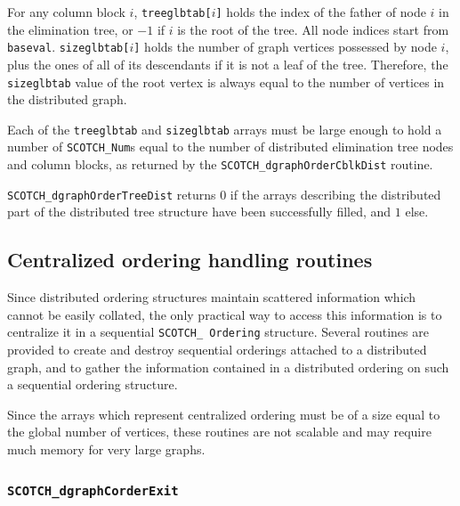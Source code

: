 \begin{itemize}
For any column block $i$, {\tt treeglbtab[}$i${\tt ]} holds the index
of the father of node $i$ in the elimination tree, or $-1$ if $i$ is
the root of the tree. All node indices start from
{\tt baseval}. {\tt size\lbt glb\lbt tab[}$i${\tt ]} holds the number
of graph vertices possessed by node $i$, plus the ones of all
of its descendants if it is not a leaf of the tree. Therefore, the
{\tt size\lbt glb\lbt tab} value of the root vertex is always equal to
the number of vertices in the distributed graph.

Each of the {\tt treeglbtab} and {\tt size\lbt glb\lbt tab} arrays
must be large enough to hold a number of {\tt SCOTCH\_\lbt Num}s equal
to the number of distributed elimination tree nodes and column blocks,
as returned by the {\tt SCOTCH\_\lbt dgraph\lbt Order\lbt Cblk\lbt Dist}
routine.

\progret

{\tt SCOTCH\_dgraphOrderTreeDist} returns $0$ if the arrays describing
the distributed part of the distributed tree structure have been
successfully filled, and $1$ else.
\end{itemize}

\subsection{Centralized ordering handling routines}
\label{sec-lib-func-corder}

Since distributed ordering structures maintain scattered information
which cannot be easily collated, the only practical way to access this
information is to centralize it in a sequential {\tt SCOTCH\_\lbt
Ordering} structure. Several routines are provided to
create and destroy sequential orderings attached to a distributed
graph, and to gather the information contained in a distributed
ordering on such a sequential ordering structure.

Since the arrays which represent centralized ordering must be of a
size equal to the global number of vertices, these routines are not
scalable and may require much memory for very large graphs.

\subsubsection{{\tt SCOTCH\_dgraphCorderExit}}


